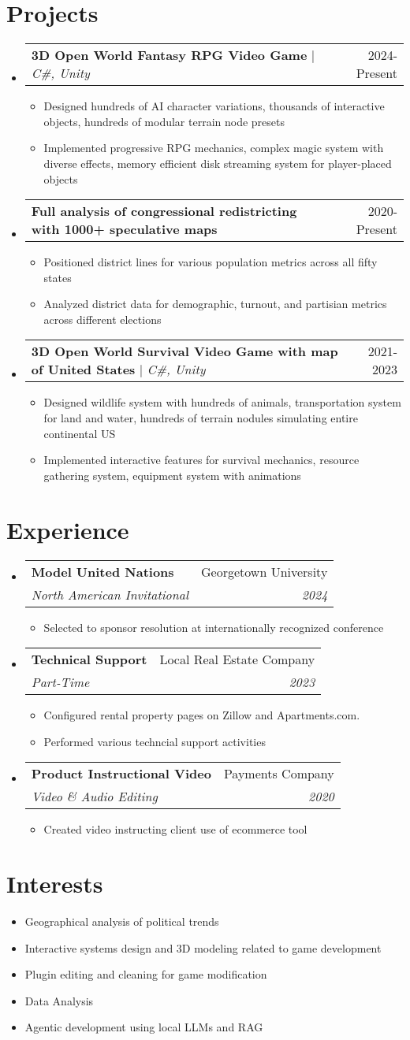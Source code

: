 \documentclass[letterpaper,11pt]{article}
\makeatletter
\newcommand{\resumeItem}[1]{ 
  \item\small{\parbox[t]{0.8\textwidth}{#1} \vspace{-2pt}} 
  }
\newcommand{\resumeItemLongLines}[1]{ 
  \item\small{\parbox[t]{0.8\textwidth}{#1} \vspace{2pt}} 
  }
\newcommand{\resumeSubheading}[4]{ 
  \vspace{-2pt}\item 
  \begin{tabular*}{0.97\textwidth}[t]{l@{\extracolsep{\fill}}r} 
    \textbf{#1} & #2 \\ 
    \textit{\small#3} & \textit{\small #4} \\ 
  \end{tabular*}\vspace{-7pt} 
}
\newcommand{\resumeProjectHeading}[2]{ 
  \item 
  \begin{tabular*}{0.97\textwidth}[t]{l@{\extracolsep{\fill}}r} 
    \small#1 & #2 \\ 
  \end{tabular*}\vspace{-7pt} 
}
\newcommand{\resumeSubHeadingListStart}{\begin{itemize}[leftmargin=0.15in, label={}]}
\newcommand{\resumeSubHeadingListEnd}{\end{itemize}}
\newcommand{\resumeItemListStart}{\begin{itemize}[leftmargin=0.15in, label={}]}
\newcommand{\resumeItemListEnd}{\end{itemize}\vspace{-5pt}}
\makeatother
\begin{document}
\section{Projects} 
  \resumeSubHeadingListStart 
    \resumeProjectHeading 
      {\textbf{3D Open World Fantasy RPG Video Game} $|$ \emph{C\#, Unity}}{2024-Present} 
      \resumeItemListStart 
        \resumeItemLongLines{Designed hundreds of AI character variations, thousands of interactive objects, hundreds of modular terrain node presets} 
        \resumeItem{Implemented progressive RPG mechanics, complex magic system with diverse effects, memory efficient disk streaming system for player-placed objects} 
      \resumeItemListEnd 
    \resumeProjectHeading 
      {\textbf{Full analysis of congressional redistricting with 1000+ speculative maps} \emph{}}{2020-Present} 
      \resumeItemListStart 
        \resumeItemLongLines{Positioned district lines for various population metrics across all fifty states} 
        \resumeItem{Analyzed district data for demographic, turnout, and partisian metrics across different elections} 
      \resumeItemListEnd 
    \resumeProjectHeading 
      {\textbf{3D Open World Survival Video Game with map of United States} $|$ \emph{C\#, Unity}}{2021-2023} 
      \resumeItemListStart 
        \resumeItemLongLines{Designed wildlife system with hundreds of animals, transportation system for land and water, hundreds of terrain nodules simulating entire continental US} 
        \resumeItem{Implemented interactive features for survival mechanics, resource gathering system, equipment system with animations} 
      \resumeItemListEnd 
  \resumeSubHeadingListEnd 

\section{Experience} 
  \resumeSubHeadingListStart 
    \resumeSubheading 
      {Model United Nations}{Georgetown University} 
      {North American Invitational}{2024} 
      \resumeItemListStart 
        \resumeItem{Selected to sponsor resolution at internationally recognized conference} 
      \resumeItemListEnd 
    \resumeSubheading 
      {Technical Support}{Local Real Estate Company} 
      {Part-Time}{2023} 
      \resumeItemListStart 
        \resumeItem{Configured rental property pages on Zillow and Apartments.com. } 
        \resumeItem{Performed various techncial support activities} 
      \resumeItemListEnd 
    \resumeSubheading 
      {Product Instructional Video}{Payments Company} 
      {Video \& Audio Editing}{2020} 
      \resumeItemListStart 
        \resumeItem{Created video instructing client use of ecommerce tool} 
      \resumeItemListEnd 
  \resumeSubHeadingListEnd 

\section{Interests} 
  \resumeItemListStart 
    \resumeItem{Geographical analysis of political trends} 
    \resumeItem{Interactive systems design and 3D modeling related to game development} 
    \resumeItem{Plugin editing and cleaning for game modification} 
    \resumeItem{Data Analysis} 
    \resumeItem{Agentic development using local LLMs and RAG}
  \resumeItemListEnd 
\end{document}
